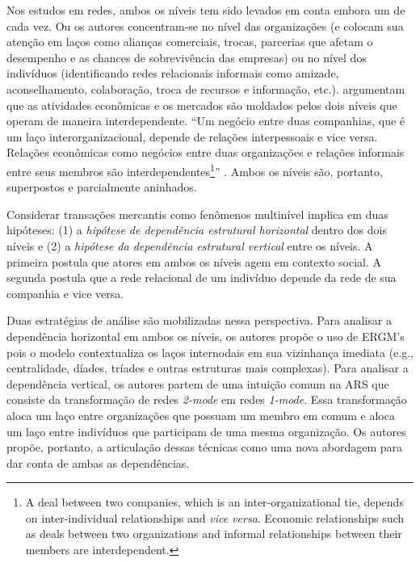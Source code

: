 \documentclass[a4paper, 12pt, openright, oneside, german, french, english, brazil]{abntex2}
\begin{document}
	Nos estudos em redes, ambos os níveis tem sido levados em conta embora um de cada vez. Ou os autores concentram-se no nível das organizações (e colocam sua atenção em laços como alianças comerciais, trocas, parcerias que afetam o desempenho e as chances de sobrevivência das empresas) ou no nível dos indivíduos (identificando redes relacionais informais como amizade, aconselhamento, colaboração, troca de recursos e informação, etc.).  argumentam que as atividades econômicas e os mercados são moldados pelos dois níveis que operam de maneira interdependente. ``Um negócio entre duas companhias, que é um laço interorganizacional, depende de relações interpessoais e vice versa. Relações econômicas como negócios entre duas organizações e relações informais entre seus membros são interdependentes\footnote{A deal between two companies, which is an inter-organizational tie, depends on inter-individual relationships and \textit{vice versa}. Economic relationships such as deals between two organizations and informal relationships between their members are interdependent.}'' \cite[p. 246]{brailly2016market}. Ambos os níveis são, portanto, superpostos e parcialmente aninhados.
	
	Considerar transações mercantis como fenômenos multinível implica em duas hipóteses: (1) a \textit{hipótese de dependência estrutural horizontal} dentro dos dois níveis e (2) a \textit{hipótese da dependência estrutural vertical} entre os níveis. A primeira postula que atores em ambos os níveis agem em contexto social. A segunda postula que a rede relacional de um indivíduo depende da rede de sua companhia e vice versa.
	
	Duas estratégias de análise são mobilizadas nessa perspectiva. Para analisar a dependência horizontal em ambos os níveis, os autores propõe o uso de ERGM's pois o modelo contextualiza os laços internodais em sua vizinhança imediata (e.g., centralidade, díades, tríades e outras estruturas mais complexas). Para analisar a dependência vertical, os autores partem de uma intuição comum na ARS que consiste da transformação de redes \textit{2-mode} em redes \textit{1-mode}. Essa transformação aloca um laço entre organizações que possuam um membro em comum e aloca um laço entre indivíduos que participam de uma mesma organização. Os autores propõe, portanto, a articulação dessas técnicas como uma nova abordagem para dar conta de ambas as dependências.
	
	
	
\end{document}
